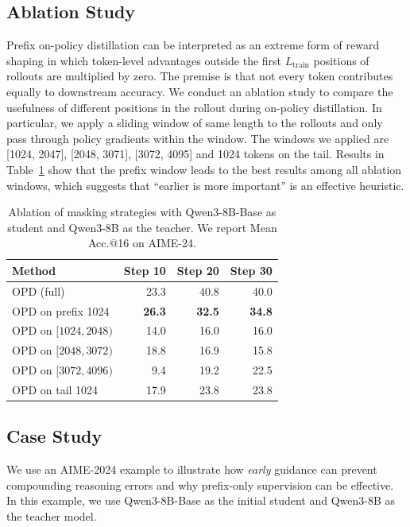 \documentclass[11pt]{article}
\begin{document}
\subsection{Ablation Study}  
  
Prefix on-policy distillation can be interpreted as an extreme form of reward shaping in which token-level advantages outside the first $L_{\text{train}}$ positions of rollouts are multiplied by zero.    
The premise is that not every token contributes equally to downstream accuracy.    
We conduct an ablation study to compare the usefulness of different positions in the rollout during on-policy distillation. 
In particular, we apply a sliding window of same length to the rollouts and only pass through policy gradients within the window. The windows we applied are [1024, 2047], [2048, 3071], [3072, 4095] and 1024 tokens on the tail.
Results in Table~\ref{tab:ablation study} show that the prefix window leads to the best results among all ablation windows, which suggests that ``earlier is more important'' is an effective heuristic. 

\begin{table}[h!]  
\centering  
\small  
\begin{tabular}{l|r|r|r}  
\hline  
Method & Step 10 & Step 20 & Step 30 \\  
\hline  
OPD (full)       & 23.3 & 40.8 & 40.0\\ 
\hline 
OPD on prefix 1024       & \textbf{26.3} & \textbf{32.5} & \textbf{34.8} \\  
OPD on $[1024,2048)$      & 14.0 & 16.0 &  16.0 \\  
OPD on $[2048, 3072)$     & 18.8 & 16.9 & 15.8 \\  
OPD on $[3072, 4096)$     & 9.4 & 19.2 &  22.5 \\  
OPD on tail 1024        & 17.9 & 23.8 &  23.8 \\ 
\hline  
\end{tabular}  
\caption{Ablation of masking strategies with Qwen3-8B-Base as student and Qwen3-8B as the teacher. We report Mean Acc.@16 on AIME-24.
}
\label{tab:ablation study}  
\end{table}  


\subsection{Case Study}  
\label{sec:case study}  
  
We use an AIME-2024 example to illustrate how \emph{early} guidance can prevent compounding reasoning errors and why prefix-only supervision can be effective. In this example, we use Qwen3-8B-Base as the initial student and Qwen3-8B as the teacher model.
  
\end{document}
